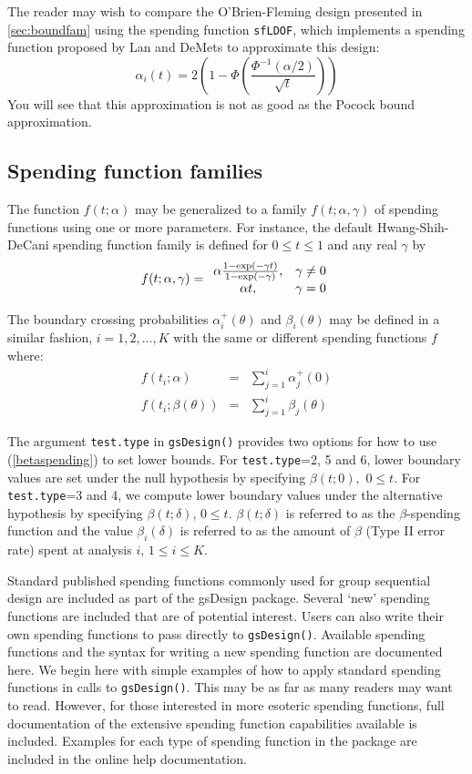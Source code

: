 The reader may wish to compare the O'Brien-Fleming design presented in \ref{sec:boundfam} using the spending function \texttt{sfLDOF}, which implements a spending function proposed by Lan and DeMets \cite{LanDeMets} to approximate this design:
\begin{equation}
\alpha_i(t)=2\left(  1-\Phi\left(  \frac{\Phi
^{-1}(\alpha/2)}{\sqrt{t}}\right)  \right)
\end{equation}
You will see that this approximation is not as good as the Pocock bound approximation.
\subsection{Spending function families}
The function $f(t;\alpha)$ may be generalized to a family $f(t;\alpha,\gamma)$ of spending functions using one or more parameters. 
For instance, the default Hwang-Shih-DeCani spending function family is defined for $0\leq t\leq 1$ and any real $\gamma$ by
\[
f(t;\alpha, \gamma)=%
\begin{array}
[c]{cc}%
\alpha\frac{1-\exp(-\gamma t)}{1-\exp(-\gamma)}, & \gamma\neq 0\\
\alpha t, & \gamma=0
\end{array}
\]

The boundary crossing probabilities $\alpha_i^{+}(\theta)$ and $\beta_i(\theta)$ may be defined in a similar fashion, $i=1,2,\ldots,K$ with the same or different spending functions $f$ where: 
\begin{eqnarray}
f(t_i;\alpha)&=&\sum_{j=1}^{i}\alpha_{j}^{+}(0)\label{alpha+spending}\\
f(t_i;\beta(\theta))&=&\sum_{j=1}^{i}\beta_j(\theta)\label{betaspending}
\end{eqnarray}

The argument \texttt{test.type} in \texttt{gsDesign()} provides two options for how to use (\ref{betaspending}) to set lower bounds. 
For \texttt{test.type}=2, 5 and 6, lower boundary values are set under
the null hypothesis by specifying $\beta(t;0),$ $0\leq t$. 
For \texttt{test.type}=3 and 4, we compute lower boundary values under the
alternative hypothesis by specifying $\beta(t;\delta)$, $0\leq t$.
$\beta(t;\delta)$ is referred to as the $\beta$-spending function and the
value $\beta_{i}(\delta)$ is referred to as the amount of $\beta$ (Type
II error rate) spent at analysis $i$, $1\leq i\leq K$.

Standard published spending functions commonly used for group sequential
design are included as part of the gsDesign package. 
Several `new' spending functions are included that are of potential interest. 
Users can also write their own spending functions to pass directly to \texttt{gsDesign()}. 
Available spending functions and the syntax for writing a new spending function are documented here. 
We begin here with simple examples of how to apply standard spending functions in calls to \texttt{gsDesign()}. 
This may be as far as many readers may want to read. 
However, for those interested in more esoteric spending functions, full documentation of the extensive spending function capabilities available is included. 
Examples for each type of spending function in the package are included in the online help documentation.

